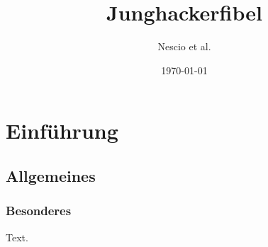 \documentclass[a4paper,11pt]{scrbook}
\makeatletter
\DeclareRobustCommand{\,}{%
  \relax\ifmmode\mskip\thinmuskip\else\thinspace\fi
  \@ifstar{\hskip\z@skip}{}%
}
\makeatother
\begin{document}
\frontmatter

\title{Junghackerfibel}
\author{Nescio et al.}
\date{\today}
\maketitle




\tableofcontents %

\mainmatter

\chapter{Einführung}

\section{Allgemeines}

\subsection{Besonderes}

Text.
\end{document}
